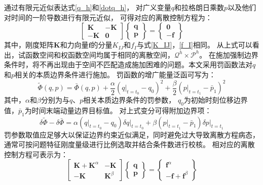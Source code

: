 通过有限元近似表达式\eqref{q_h}和\eqref{dotq_h}，
对广义变量$q$和拉格朗日乘数$p$以及他们对时间的一阶导数进行有限元近似，
可得对应的离散控制方程为：
\begin{equation}
\begin{bmatrix}
\boldsymbol K & -\boldsymbol K \\ -\boldsymbol K & \boldsymbol 0
\end{bmatrix}
\begin{Bmatrix}
\boldsymbol q \\ \boldsymbol p
\end{Bmatrix} =
\begin{Bmatrix}
 \boldsymbol 0 \\ -\boldsymbol f
\end{Bmatrix}
\end{equation}
其中，刚度矩阵$\boldsymbol K$和力向量$\boldsymbol f$的分量$K_{IJ}$和$f_I$与式\eqref{K_IJ}，\eqref{f_I}相同。
从上式可以看出，试函数空间和权函数空间均属于相同的离散空间，$\mathcal{Q}^h\times \mathcal{P}^h$。
在施加强制边界条件时，将不再出现由于空间不匹配造成施加困难的问题。本文采用罚函数法\cite{hughes2000finite}对$q$和$p$相关的本质边界条件进行施加。
罚函数的增广能量泛函可写为：
\begin{equation}
\tilde{\Phi}(q,p)
= \bar \Phi(q,p)
+ \frac{\alpha}{2}\left(q \vert_{t=t_0}-q_0\right)^2
+ \frac{\beta}{2}\left(p\vert_{t=t_1}-\bar p_1\right)^2
\end{equation}
其中，$\alpha$和$\beta$分别为与$q$、$p$相关本质边界条件的罚参数，
$q_0$为初始时刻位移边界值，$\bar p_1$为时间末端动量边界目标值。
对上式变分可得附加边界项：
\begin{equation}
\delta \tilde{\Phi} -\delta \bar \Phi
= \alpha \left(q\vert_{t=t_0}-q_0\right)\delta q\vert_{t=t_0}
+ \beta \left(p\vert_{t=t_1}-\bar p_1\right)\delta p\vert_{t=t_1}
\end{equation}
罚参数取值应足够大以保证边界约束近似满足，同时避免过大导致离散方程病态，
通常可按问题特征刚度量级进行比例选取并结合条件数进行校核。
相对应的离散控制方程可表示为：
\begin{equation}\label{2.25}
\begin{bmatrix}
\boldsymbol K + \boldsymbol K^\alpha & -\boldsymbol K \\ -\boldsymbol K & \boldsymbol K^\beta
\end{bmatrix}
\begin{Bmatrix}
\boldsymbol q \\ \boldsymbol p
\end{Bmatrix} =
\begin{Bmatrix}
 \boldsymbol f^\alpha \\ -\boldsymbol f + \boldsymbol f^\beta
\end{Bmatrix}
\end{equation}

